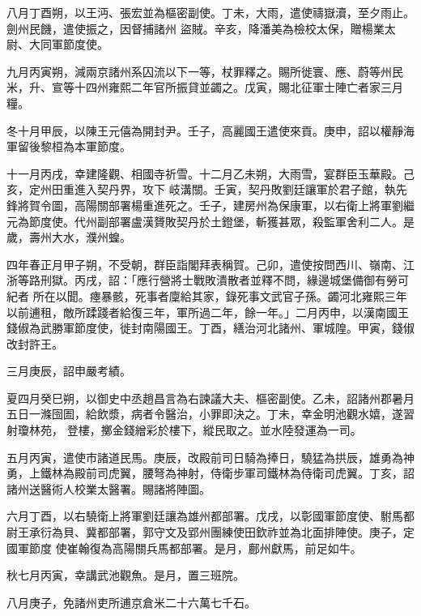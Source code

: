 \begin{pinyinscope}
 八月丁酉朔，以王沔、張宏並為樞密副使。丁未，大雨，遣使禱嶽瀆，至夕雨止。劍州民饑，遣使振之，因督捕諸州
 盜賊。辛亥，降潘美為檢校太保，贈楊業太尉、大同軍節度使。



 九月丙寅朔，減兩京諸州系囚流以下一等，杖罪釋之。賜所徙寰、應、蔚等州民米，升、宣等十四州雍熙二年官所振貸並蠲之。戊寅，賜北征軍士陣亡者家三月糧。



 冬十月甲辰，以陳王元僖為開封尹。壬子，高麗國王遣使來貢。庚申，詔以權靜海軍留後黎桓為本軍節度。



 十一月丙戌，幸建隆觀、相國寺祈雪。十二月乙未朔，大雨雪，宴群臣玉華殿。己亥，定州田重進入契丹界，攻下
 岐溝關。壬寅，契丹敗劉廷讓軍於君子館，執先鋒將賀令圖，高陽關部署楊重進死之。壬子，建房州為保康軍，以右衛上將軍劉繼元為節度使。代州副部署盧漢贇敗契丹於土鐙堡，斬獲甚眾，殺監軍舍利二人。是歲，壽州大水，濮州蝗。



 四年春正月甲子朔，不受朝，群臣詣閣拜表稱賀。己卯，遣使按問西川、嶺南、江浙等路刑獄。丙戌，詔：「應行營將士戰敗潰散者並釋不問，緣邊城堡備御有勞可紀者
 所在以聞。瘞暴骸，死事者廩給其家，錄死事文武官子孫。蠲河北雍熙三年以前逋租，敵所蹂踐者給復三年，軍所過二年，餘一年。」二月丙申，以漢南國王錢俶為武勝軍節度使，徙封南陽國王。丁酉，繕治河北諸州、軍城隍。甲寅，錢俶改封許王。



 三月庚辰，詔申嚴考績。



 夏四月癸巳朔，以御史中丞趙昌言為右諫議大夫、樞密副使。乙未，詔諸州郡暑月五日一滌囹圄，給飲漿，病者令醫治，小罪即決之。丁未，幸金明池觀水嬉，遂習射瓊林苑，
 登樓，擲金錢繒彩於樓下，縱民取之。並水陸發運為一司。



 五月丙寅，遣使市諸道民馬。庚辰，改殿前司日騎為捧日，驍猛為拱辰，雄勇為神勇，上鐵林為殿前司虎翼，腰弩為神射，侍衛步軍司鐵林為侍衛司虎翼。丁亥，詔諸州送醫術人校業太醫署。賜諸將陣圖。



 六月丁酉，以右驍衛上將軍劉廷讓為雄州都部署。戊戌，以彰國軍節度使、駙馬都尉王承衍為貝、冀都部署，郭守文及郢州團練使田欽祚並為北面排陣使。庚子，定國軍節度
 使崔翰復為高陽關兵馬都部署。是月，鄜州獻馬，前足如牛。



 秋七月丙寅，幸講武池觀魚。是月，置三班院。



 八月庚子，免諸州吏所逋京倉米二十六萬七千石。




\end{pinyinscope}
